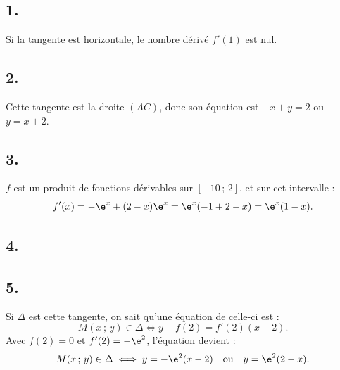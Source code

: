 \subsection*{1.}

Si la tangente est horizontale, le nombre dérivé \(f'(1)\) est nul.

\subsection*{2.}

Cette tangente est la droite \((AC)\), donc son équation est \(-x + y = 2\) ou \(y = x + 2\).

\subsection*{3.}

\(f\) est un produit de fonctions dérivables sur \([-10\,;\,2]\), et sur cet intervalle :
\[
f'(x) = -\e^x + (2 - x) \e^x = \e^x (-1 + 2 - x) = \e^x(1 - x).
\]

\subsection*{4.}

\begin{center}
\end{center}

\subsection*{5.}

Si \(\Delta\) est cette tangente, on sait qu'une équation de celle-ci est :
\[
M(x\,;\,y) \in \Delta \iff y - f(2) = f'(2)(x - 2).
\]
Avec \(f(2) = 0\) et \(f'(2) = -\e^2\), l'équation devient :
\[
M(x\,;\,y) \in \Delta \iff y = -\e^2(x - 2) \quad \text{ou} \quad y = \e^2(2 - x).
\]
